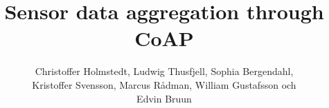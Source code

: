 \documentclass[12pt,a4paper,titlepage]{article}
\begin{document}
\title{Sensor data aggregation through CoAP} 
\author{
Christoffer Holmstedt, Ludwig Thusfjell, Sophia Bergendahl, \\
Kristoffer Svensson, Marcus Rådman, William Gustafsson och \\
Edvin Bruun
}
\maketitle

\setcounter{page}{2}

%
%
%
\end{document}
